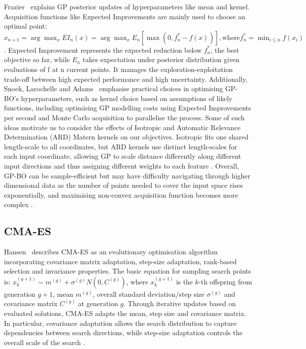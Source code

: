 \documentclass[11pt]{article}
\begin{document}
\noindent Frazier~\cite{frazier2018tutorial} explains GP posterior updates of hyperparameters like mean and kernel. Acquisition functions like Expected Improvements are mainly used to choose an optimal point: $x_{n+1} = \arg\max\nolimits_x EI_n(x)
= \arg\max\nolimits_x E_n[\max(0, f_n^* - f(x))],\text{where} f_n^* = \min\nolimits_{i \leq n} f(x_i)$. Expected Improvement represents the expected reduction below $f_n^*$, the best objective so far, while $E_n$ takes expectation under posterior distribution given evaluations of f at n current points. It manages the exploration-exploitation trade-off between high expected performance and high uncertainty. Additionally,  Snoek, Larochelle and Adams~\cite{snoek2012practical} emphasise practical choices in optimising GP-BO’s hyperparameters, such as kernel choice based on assumptions of likely functions, including optimising GP modelling costs using Expected Improvements per second and Monte Carlo acquisition to parallelise the process. Some of such ideas motivate us to consider the effects of Isotropic and Automatic Relevance Determination (ARD) Matern kernels on our objectives. Isotropic fits one shared length-scale to all coordinates, but ARD kernels use distinct length-scales for each input coordinate, allowing GP to scale distance differently along different input directions and thus assigning different weights to each feature \cite{tang2026isotropic}. Overall, GP-BO can be sample-efficient but may have difficulty navigating through higher dimensional data as the number of points needed to cover the input space rises exponentially, and maximising non-convex acquisition function becomes more complex \cite{malu2021bayesian}.

\subsection{CMA-ES}

\noindent Hansen~\cite{hansen2023cma} describes CMA-ES as an evolutionary optimisation algorithm incorporating covariance matrix adaptation, step-size adaptation, rank-based selection and invariance properties. The basic equation for sampling search points is: $x_k^{(g+1)} \sim m^{(g)} + \sigma^{(g)} N(0, C^{(g)})$, where $x_k^{(g+1)}$ is the $k$-th offspring from generation $g+1$, mean $m^{(g)}$, overall standard deviation/step size $\sigma^{(g)}$ and covariance matrix $C^{(g)}$ at generation $g$. Through iterative updates based on evaluated solutions, CMA-ES adapts the mean, step size and covariance matrix. In particular, covariance adaptation allows the search distribution to capture dependencies between search directions, while step-size adaptation controls the overall scale of the search \cite{hansen2023cma}.
\end{document}
